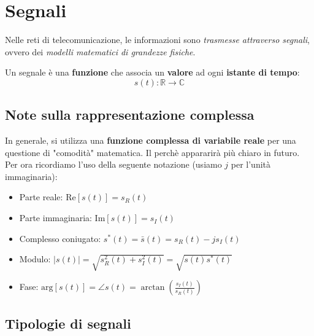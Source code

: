 
\chapter{Segnali}

Nelle reti di telecomunicazione, le informazioni sono \textit{trasmesse attraverso segnali}, 
ovvero dei \textit{modelli matematici di grandezze fisiche}.

\begin{definition}[SEGNALE]
    Un segnale è una \textbf{funzione} che associa un \textbf{valore} ad
    ogni \textbf{istante di tempo}:
    \[
        s(t) : \mathbb{R} \to \mathbb{C}
    \] 
\end{definition}


\section{Note sulla rappresentazione complessa}

In generale, si utilizza una \textbf{funzione complessa di variabile reale} per 
una questione di "comodità" matematica.
Il perchè appararirà più chiaro in futuro. Per ora ricordiamo l'uso 
della seguente notazione (usiamo $j$ per l'unità immaginaria):

\begin{itemize}
    \item Parte reale: $\text{Re}[s(t)]=s_R(t)$
    \item Parte immaginaria: $\text{Im}[s(t)] = s_I(t)$
    \item Complesso coniugato: $s^*(t)=\bar{s}(t) = s_R(t) - js_I(t)$
    \item Modulo: $|s(t)| = \sqrt{s_R^2(t) + s_I^2(t)} = \sqrt{s(t)s^*(t)}$
    \item Fase: $\text{arg}[s(t)] = \angle s(t) = \arctan(\frac{s_I(t)}{s_R(t)})$
\end{itemize}


\section{Tipologie di segnali}

